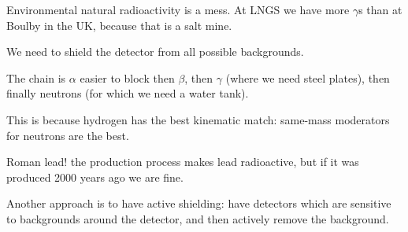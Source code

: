 \documentclass[main.tex]{subfiles}
\begin{document}
Environmental natural radioactivity is a mess. 
At LNGS we have more \(\gamma \)s than at Boulby in the UK, because that is a salt mine. 


We need to shield the detector from all possible backgrounds. 

The chain is \(\alpha \) easier to block then \(\beta \), then \(\gamma \) (where we need steel plates), then finally neutrons (for which we need a water tank). 

This is because hydrogen has the best kinematic match: same-mass moderators for neutrons are the best. 

Roman lead! the production process makes lead radioactive, 
but if it was produced 2000 years ago we are fine. 

Another approach is to have active shielding: have detectors which are sensitive to backgrounds around the detector, and then actively remove the background. 
\end{document}
